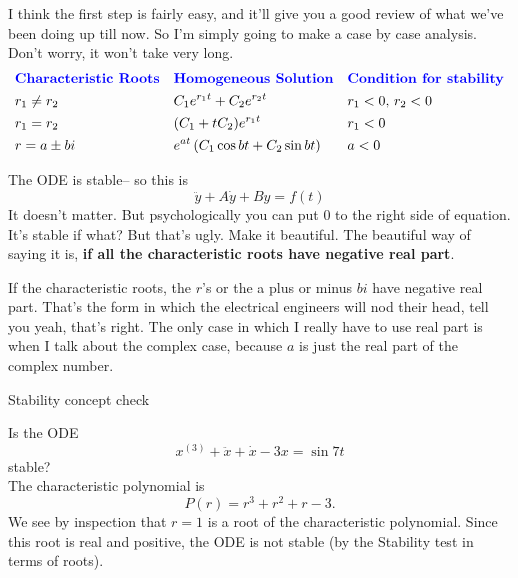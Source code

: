 I think the first step is fairly easy, and it'll give you a good review of what
we've been doing up till now.
So I'm simply going to make a case by case analysis.
Don't worry, it won't take very long.
\begin{align*}
  &\text{\textbf{\color{blue}Characteristic Roots}}&
  &\text{\textbf{\color{blue} Homogeneous Solution}} &
  &\text{\textbf{\color{blue}Condition for stability}} \\
  & r_ 1 \neq r_ 2 &
  & C_ 1 e^{r_ 1 t}  + C_ 2 e^{r_ 2 t} &
  & r_ 1 < 0 , \, r_ 2 < 0\\
  & r_ 1 = r_ 2&
  & (C_ 1  + tC_ 2) e^{r_ 1 t}&
  & r_ 1 < 0  \\                 
  &r = a \pm bi & 
  &e^{at} \left(C_ 1 \cos bt  +  C_ 2 \sin bt \right) &
  & a < 0
\end{align*}

The ODE is stable-- so this is
\begin{equation*}
  \ddot{y} + A \dot{y} + By = f(t)
\end{equation*}
It doesn't matter. But psychologically you can put $0$ to the right side of equation.
It's stable if what?
But that's ugly. Make it beautiful.
The beautiful way of saying it is, \textbf{if all the characteristic roots have negative real part}.

If the characteristic roots, the $r$'s or the a plus or minus $bi$ have negative real part.
That's the form in which the electrical engineers will nod their head, tell you yeah, that's right.
The only case in which I really have to use real part is when I talk about the complex case,
because $a$ is just the real part of the complex number.\\

\begin{exercise}
  Stability concept check
\end{exercise}
Is the ODE
\begin{equation*}
  \displaystyle  x^{\left(3\right)}+\ddot{x}+\dot{x}-3x=\sin 7t
\end{equation*}
stable?\\
The characteristic polynomial is
\begin{equation*}
  \displaystyle  P\left(r\right)=r^3+r^2+r-3.
\end{equation*}
We see by inspection that $r = 1$ is a root of the characteristic polynomial.
Since this root is real and positive, the ODE is not stable (by the Stability test in terms of roots).

\clearpage

